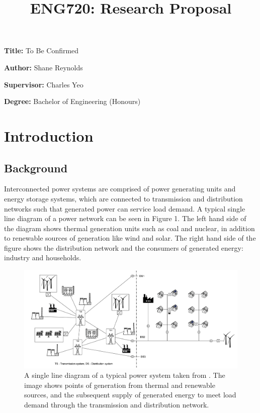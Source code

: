 \documentclass[12pt, a4paper]{article}
\title{ENG720: Research Proposal}
\author{}
\date{}
\newcommand{\namelistlabel}[1]{\mbox{#1}\hfil}
\newenvironment{namelist}[1]{%
\begin{list}{}
    {
        \let\makelabel\namelistlabel
        \settowidth{\labelwidth}{#1}
        \setlength{\leftmargin}{1.1\labelwidth}
    }
  }{%
\end{list}}
\begin{document}
\maketitle

\begin{namelist}{xxxxxxxxxxxx}
\item[{\bf Title:}]
	To Be Confirmed
\item[{\bf Author:}]
	Shane Reynolds
\item[{\bf Supervisor:}]
	Charles Yeo
\item[{\bf Degree:}]
	Bachelor of Engineering (Honours)
\end{namelist}

\section{Introduction}
\subsection{Background}
Interconnected power systems are comprised of power generating units and energy storage systems, which are connected to transmission and distribution networks such that generated power can service load demand. A typical single line diagram of a power network can be seen in Figure 1. The left hand side of the diagram shows thermal generation units such as coal and nuclear, in addition to renewable sources of generation like wind and solar. The right hand side of the figure shows the distribution network and the consumers of generated energy: industry and households.
\begin{figure}[h]
	\centering
	\includegraphics[scale=0.75]{power_system}
	\caption{A single line diagram of a typical power system taken from \cite{Glavic2019}. The image shows points of generation from thermal and renewable sources, and the subsequent supply of generated energy to meet load demand through the transmission and distribution network.}
\end{figure}
\end{document}

